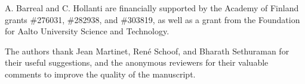 \documentclass[smallextended]{svjour3}
\newcommand{\Z}{\mathbb{Z}}
\newcommand{\Or}{\mathcal{O}}
\begin{document}
\begin{acknowledgements}
A. Barreal and C. Hollanti are financially supported by the Academy of Finland grants \#276031, \#282938, and \#303819, as well as a grant from the Foundation for Aalto University Science and Technology.

\medskip 
The authors thank Jean Martinet, Ren\'e Schoof, and Bharath Sethuraman for their useful suggestions, and the anonymous reviewers for their valuable comments to improve the quality of the manuscript. 
\end{acknowledgements}




\end{document}

